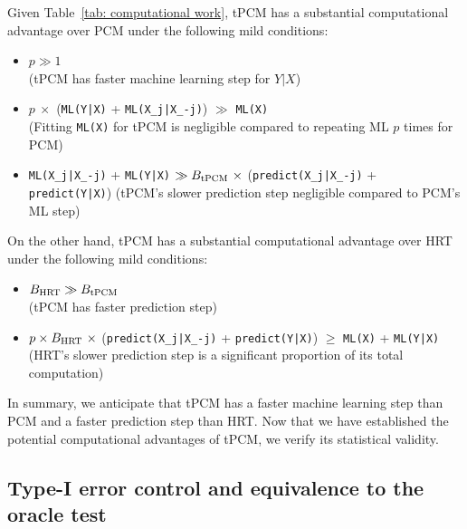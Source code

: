 \documentclass[12pt]{article}
\theoremstyle{definition}
\theoremstyle{remark}
\begin{document}
Given Table~\ref{tab: computational work}, tPCM has a substantial computational advantage over PCM under the following mild conditions:
\begin{itemize}
	\item $p \gg 1$ \\ (tPCM has faster machine learning step for $Y|X$)
	\item $p\ \times $ (\verb!ML(Y|X)! + \verb!ML(X_j|X_-j)!) $\gg$ \verb!ML(X)!  \\ (Fitting \verb!ML(X)! for tPCM is negligible compared to repeating ML $p$ times for PCM)
	\item \verb!ML(X_j|X_-j)! + \verb!ML(Y|X)! $ \gg B_{\textnormal{tPCM}} \ \times $ (\verb!predict(X_j|X_-j)! + \verb!predict(Y|X)!) (tPCM's slower prediction step negligible compared to PCM's ML step)
\end{itemize}
On the other hand, tPCM has a substantial computational advantage over HRT under the following mild conditions:
\begin{itemize}
	\item $B_{\textnormal{HRT}} \gg B_{\textnormal{tPCM}}$ \\
	(tPCM has faster prediction step)
	\item $p  \times  B_{\textnormal{HRT}}\ \times$ (\verb!predict(X_j|X_-j)! + \verb!predict(Y|X)!) $ \geq $ \verb!ML(X)! + \verb!ML(Y|X)! \\ (HRT's slower prediction step is a significant proportion of its total computation)
\end{itemize}
In summary, we anticipate that tPCM has a faster machine learning step than PCM and a faster prediction step than HRT. Now that we have established the potential computational advantages of tPCM, we verify its statistical validity.

\subsection{Type-I error control and equivalence to the oracle test} \label{sec:tpcm-type-i-error-control}
\end{document}
